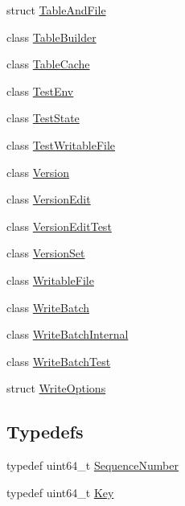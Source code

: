 \begin{DoxyCompactItemize}
\item 
struct \mbox{\hyperlink{structleveldb_1_1_table_and_file}{Table\+And\+File}}
\item 
class \mbox{\hyperlink{classleveldb_1_1_table_builder}{Table\+Builder}}
\item 
class \mbox{\hyperlink{classleveldb_1_1_table_cache}{Table\+Cache}}
\item 
class \mbox{\hyperlink{classleveldb_1_1_test_env}{Test\+Env}}
\item 
class \mbox{\hyperlink{classleveldb_1_1_test_state}{Test\+State}}
\item 
class \mbox{\hyperlink{classleveldb_1_1_test_writable_file}{Test\+Writable\+File}}
\item 
class \mbox{\hyperlink{classleveldb_1_1_version}{Version}}
\item 
class \mbox{\hyperlink{classleveldb_1_1_version_edit}{Version\+Edit}}
\item 
class \mbox{\hyperlink{classleveldb_1_1_version_edit_test}{Version\+Edit\+Test}}
\item 
class \mbox{\hyperlink{classleveldb_1_1_version_set}{Version\+Set}}
\item 
class \mbox{\hyperlink{classleveldb_1_1_writable_file}{Writable\+File}}
\item 
class \mbox{\hyperlink{classleveldb_1_1_write_batch}{Write\+Batch}}
\item 
class \mbox{\hyperlink{classleveldb_1_1_write_batch_internal}{Write\+Batch\+Internal}}
\item 
class \mbox{\hyperlink{classleveldb_1_1_write_batch_test}{Write\+Batch\+Test}}
\item 
struct \mbox{\hyperlink{structleveldb_1_1_write_options}{Write\+Options}}
\end{DoxyCompactItemize}
\subsection*{Typedefs}
\begin{DoxyCompactItemize}
\item 
typedef uint64\+\_\+t \mbox{\hyperlink{namespaceleveldb_a5481ededd221c36d652c371249f869fa}{Sequence\+Number}}
\item 
typedef uint64\+\_\+t \mbox{\hyperlink{namespaceleveldb_a7e9a9725b13fa0bd922d885280dfab95}{Key}}
\end{DoxyCompactItemize}
